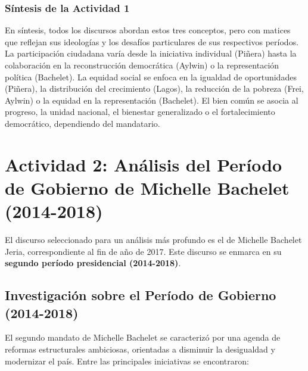 \documentclass[11pt]{article}
\begin{document}
\subsubsection*{Síntesis de la Actividad 1}
En síntesis, todos los discursos abordan estos tres conceptos, pero con matices que reflejan sus ideologías y los desafíos particulares de sus respectivos períodos. La participación ciudadana varía desde la iniciativa individual (Piñera) hasta la colaboración en la reconstrucción democrática (Aylwin) o la representación política (Bachelet). La equidad social se enfoca en la igualdad de oportunidades (Piñera), la distribución del crecimiento (Lagos), la reducción de la pobreza (Frei, Aylwin) o la equidad en la representación (Bachelet). El bien común se asocia al progreso, la unidad nacional, el bienestar generalizado o el fortalecimiento democrático, dependiendo del mandatario.

\clearpage %

\section*{Actividad 2: Análisis del Período de Gobierno de Michelle Bachelet (2014-2018)}
\label{sec:actividad2}

El discurso seleccionado para un análisis más profundo es el de Michelle Bachelet Jeria, correspondiente al fin de año de 2017. Este discurso se enmarca en su \textbf{segundo período presidencial (2014-2018)}.

\subsection*{Investigación sobre el Período de Gobierno (2014-2018)}

El segundo mandato de Michelle Bachelet se caracterizó por una agenda de reformas estructurales ambiciosas, orientadas a disminuir la desigualdad y modernizar el país. Entre las principales iniciativas se encontraron:
\end{document}
